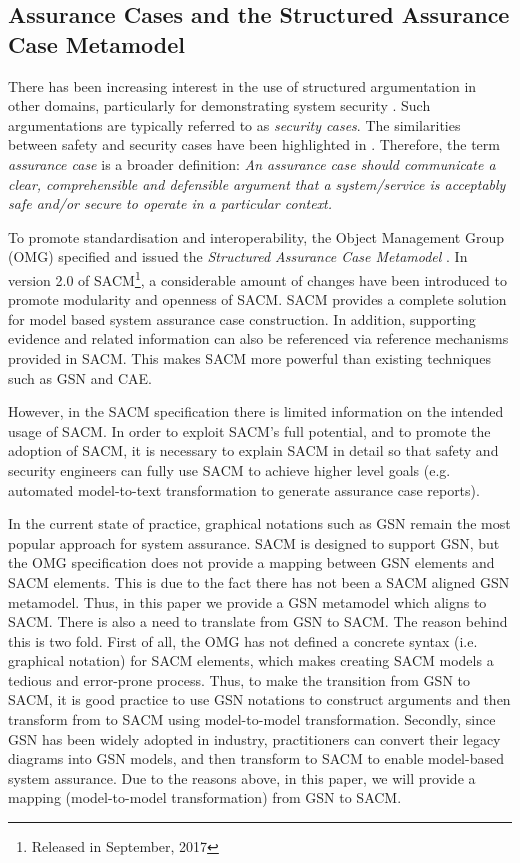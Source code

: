 \subsection{Assurance Cases and the Structured Assurance Case Metamodel}
There has been increasing interest in the use of structured argumentation in other domains, particularly for demonstrating system security \cite{bloomfield2010safety}. 
Such argumentations are typically referred to as \textit{security cases}. 
The similarities between safety and security cases have been highlighted in \cite{lautieri2005safsec}. 
Therefore, the term \textit{assurance case} is a broader definition: \textit{An assurance case should communicate a clear, comprehensible and defensible argument that a system/service is acceptably safe and/or secure to operate in a particular context.} 

To promote standardisation and interoperability, the Object Management Group (OMG) specified and issued the \textit{Structured Assurance Case Metamodel} \cite{sacm}. 
In version 2.0 of SACM\footnote{Released in September, 2017}, a considerable amount of changes have been introduced to promote modularity and openness of SACM. 
SACM provides a complete solution for model based system assurance case construction. 
In addition, supporting evidence and related information can also be referenced via reference mechanisms provided in SACM. 
This makes SACM more powerful than existing techniques such as GSN and CAE.

However, in the SACM specification there is limited information on the intended usage of SACM. 
In order to exploit SACM's full potential, and to promote the adoption of SACM, it is necessary to explain SACM in detail so that safety and security engineers can fully use SACM to achieve higher level goals (e.g. automated model-to-text transformation to generate assurance case reports). 

In the current state of practice, graphical notations such as GSN remain the most popular approach for system assurance. 
SACM is designed to support GSN, but the OMG specification does not provide a mapping between GSN elements and SACM elements. 
This is due to the fact there has not been a SACM aligned GSN metamodel. 
Thus, in this paper we provide a GSN metamodel which aligns to SACM. 
There is also a need to translate from GSN to SACM. 
The reason behind this is two fold. First of all, the OMG has not defined a concrete syntax (i.e. graphical notation) for SACM elements, which makes creating SACM models a tedious and error-prone process. 
Thus, to make the transition from GSN to SACM, it is good practice to use GSN notations to construct arguments and then transform from to SACM using model-to-model transformation. Secondly, since GSN has been widely adopted in industry, practitioners can convert their legacy diagrams into GSN models, and then transform to SACM to enable model-based system assurance. 
Due to the reasons above, in this paper, we will provide a mapping (model-to-model transformation) from GSN to SACM.

